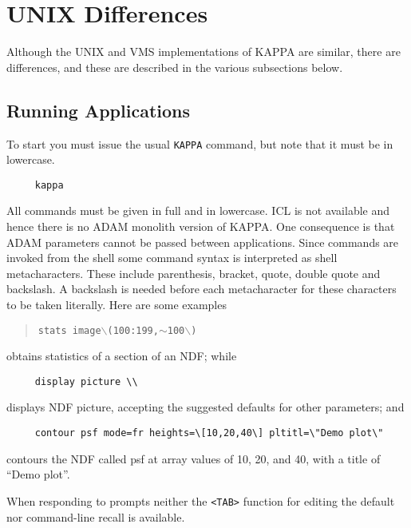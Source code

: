 {\newpage
\section{UNIX Differences}
\label{ap:unixdif}

Although the UNIX and VMS implementations of {\sc KAPPA} are similar,
there are differences, and these are described in the various
subsections below. 

\subsection{Running Applications}

To start you must issue the usual {\tt KAPPA} command, but note that
it must be in lowercase.

\begin{verbatim}
     kappa
\end{verbatim}

All commands must be given in full and in lowercase.  {\sc ICL} is
not available and hence there is no {\sc ADAM} monolith version of
{\sc KAPPA}.  One consequence is that {\sc ADAM} parameters cannot
be passed between applications.  Since commands are invoked from the
shell some command syntax is interpreted as shell metacharacters.  These
include parenthesis, bracket, quote, double quote and backslash.  A
backslash is needed before each metacharacter for these characters to be
taken literally.  Here are some examples

\begin{quote}
{\tt stats image$\backslash$(100:199,}$\sim${\tt 100$\backslash$)}
\end{quote}

obtains statistics of a section of an NDF; while

\begin{verbatim}
     display picture \\
\end{verbatim}

displays NDF picture, accepting the suggested defaults for other 
parameters; and

\begin{verbatim}
     contour psf mode=fr heights=\[10,20,40\] pltitl=\"Demo plot\"
\end{verbatim}

contours the NDF called psf at array values of 10, 20, and 40,
with a title of ``Demo plot''.

When responding to prompts neither the {\tt <TAB>} function for editing
the default nor command-line recall is available.

}

